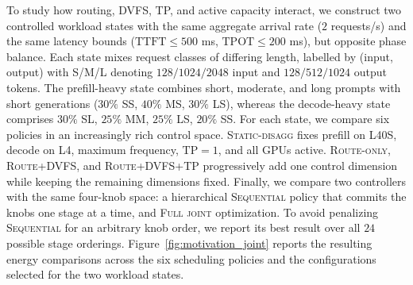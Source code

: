 To study how routing, DVFS, TP, and active capacity interact, we construct two controlled workload states with the same aggregate arrival rate ($2$ requests/s) and the same latency bounds ($\mathrm{TTFT}\leq 500$ ms, $\mathrm{TPOT}\leq 200$ ms), but opposite phase balance. 
Each state mixes request classes of differing length, labelled by (input, output) with S/M/L denoting $128/1024/2048$ input and $128/512/1024$ output tokens. 
The prefill-heavy state combines short, moderate, and long prompts with short generations ($30\%$ SS, $40\%$ MS, $30\%$ LS), whereas the decode-heavy state comprises $30\%$ SL, $25\%$ MM, $25\%$ LS, $20\%$ SS.
For each state, we compare six policies in an increasingly rich control space. 
\textsc{Static-disagg} fixes prefill on L40S, decode on L4, maximum frequency, $\mathrm{TP}{=}1$, and all GPUs active. \textsc{Route-only}, \textsc{Route+DVFS}, and \textsc{Route+DVFS+TP} progressively add one control dimension while keeping the remaining dimensions fixed. 
Finally, we compare two controllers with the same four-knob space: a hierarchical \textsc{Sequential} policy that commits the knobs one stage at a time, and \textsc{Full joint} optimization. 
To avoid penalizing \textsc{Sequential} for an arbitrary knob order, we report its best result over all $24$ possible stage orderings. 
Figure~\ref{fig:motivation_joint} reports the resulting energy comparisons across the six scheduling policies and the configurations selected for the two workload states.



